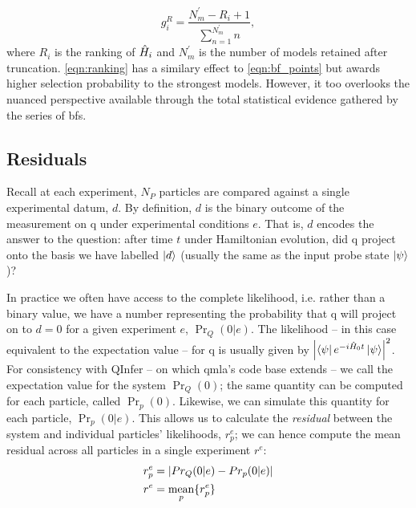 \begin{equation}
    \label{eqn:ranking}
    g_i^R = \frac{N_m^{\prime}-R_i+1}{\sum\limits_{n=1}^{N^{\prime}_m} n},
\end{equation}
    where $R_i$ is the ranking of $\hat{H}_i$ and $N_m^{\prime}$ is the number of models retained after truncation. 
\cref{eqn:ranking} has a similary effect to \cref{eqn:bf_points} but awards higher selection probability to 
    the strongest models. 
However, it too overlooks the nuanced perspective available through the total statistical evidence gathered by the series of \glspl{bf}. 

\subsection{Residuals}\label{sec:residuals}
Recall at each experiment, $N_P$ particles are compared against a single experimental datum, $d$. 
By definition, $d$ is the binary outcome of the measurement on \gls{q} under experimental conditions $e$.
That is, $d$ encodes the answer to the question: 
    after time $t$ under Hamiltonian evolution, did \gls{q} project onto 
    the basis we have labelled $\ket{d}$ (usually the same as the input \gls{probe} state $\ket{\psi}$)?
\par 
In practice we often have access to the complete \gls{likelihood}, 
    i.e. rather than a binary value, we have a number representing the probability that 
    \gls{q} will project on to $d=0$ for a given experiment $e$, $\Pr_Q(0 | e)$. 
The likelihood -- in this case equivalent to the expectation value -- 
    for \gls{q} is usually given by $\left\lvert  \bra{\psi} e^{-i\hat{H}_0 t} \ket{\psi}  \right\rvert^2$.
For consistency with QInfer \cite{qinfer-1_0} -- on which \gls{qmla}'s code base extends --
    we call the expectation value for the system $\Pr_Q(0)$;
    the same quantity can be computed for each particle, called $\Pr_p(0)$.
Likewise, we can simulate this quantity for each particle, $\Pr_p(0 | e)$. 
This allows us to calculate the \emph{residual} between the system and individual particles' \glspl{likelihood}, $r_p^e$; 
    we can hence compute the mean residual across all particles in a single experiment $r^e$:
\begin{align}
    \label{eqn:particle_residual}
    \begin{split}
    r_p^e & = \left\lvert  Pr_Q(0 | e) - Pr_p(0 | e)  \right\rvert  \\
    r^e &= \underset{p}{\text{mean}} \{r_p^e\}
    \end{split}
\end{align}
\par 

